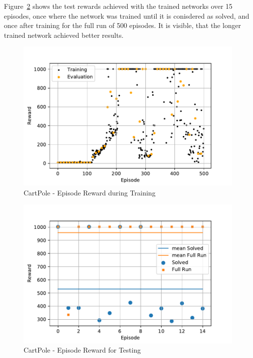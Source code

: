 \documentclass[
        a4paper,
        10pt,
        parskip = full,    %
    ]{scrartcl}
\begin{document}
Figure~\ref{CartPoleTestReward} shows the test rewards achieved with the trained
networks over 15 episodes, once where the network was trained until it is
conisdered as solved, and once after training for the full run of 500 episodes.
It is visible, that the longer trained network achieved better results.

\begin{figure}[H]
  \begin{center}
    \includegraphics{./images/CartPole-v0/tb_train_eval_reward.pdf}
    \caption{CartPole - Episode Reward during Training}
    \label{CartPoleTrainEvalReward}
  \end{center}
\end{figure}

\begin{figure}[H]
  \begin{center}
    \includegraphics{./images/CartPole-v0/tb_test_reward.pdf}
    \caption{CartPole - Episode Reward for Testing}
    \label{CartPoleTestReward}
  \end{center}
\end{figure}
\end{document}
